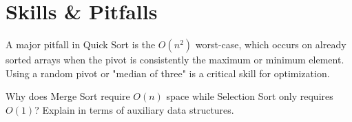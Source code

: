 \section{Skills \& Pitfalls}

\begin{remark}
    A major pitfall in Quick Sort is the $O(n^2)$ worst-case, which occurs on already sorted arrays when the pivot is consistently the maximum or minimum element. Using a random pivot or "median of three" is a critical skill for optimization.
\end{remark}

\begin{exercise}
    Why does Merge Sort require $O(n)$ space while Selection Sort only requires $O(1)$? Explain in terms of auxiliary data structures.
\end{exercise}
